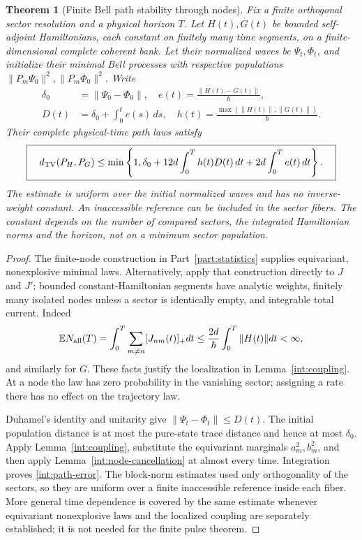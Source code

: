 \documentclass[11pt,oneside,openany]{book}
\newtheorem{theorem}{Theorem}[chapter]
\theoremstyle{definition}
\theoremstyle{remark}\newtheorem{remark}[theorem]{Remark}
\begin{document}
\begin{theorem}[Finite Bell path stability through nodes]\label{int:path-stability}
Fix a finite orthogonal sector resolution and a physical horizon $T$. Let $H(t),G(t)$ be bounded self-adjoint Hamiltonians, each constant on finitely many time segments, on a finite-dimensional complete coherent bank. Let their normalized waves be $\Psi_t,\Phi_t$, and initialize their minimal Bell processes with respective populations $\|P_m\Psi_0\|^2,\|P_m\Phi_0\|^2$. Write
\[
 \begin{aligned}\delta_0&=\|\Psi_0-\Phi_0\|,\quad
 e(t)=\frac{\|H(t)-G(t)\|}{\hbar},\\
 D(t)&=\delta_0+\int_0^t e(s)\,ds,\quad
 h(t)=\frac{\max(\|H(t)\|,\|G(t)\|)}{\hbar}.\end{aligned}
\]
Their complete physical-time path laws satisfy
\begin{equation}\label{int:path-error}
 \boxed{\quad d_{\rm TV}(P_H,P_G)
 \le\min\left\{1,\delta_0+12d\int_0^T h(t)D(t)\,dt
                      +2d\int_0^T e(t)\,dt\right\}.\quad}
\end{equation}
The estimate is uniform over the initial normalized waves and has no inverse-weight constant. An inaccessible reference can be included in the sector fibers. The constant depends on the number of compared sectors, the integrated Hamiltonian norms and the horizon, not on a minimum sector population.
\end{theorem}
\begin{proof}
The finite-node construction in Part~\ref{part:statistics} supplies equivariant, nonexplosive minimal laws. Alternatively, apply that construction directly to $J$ and $J'$; bounded constant-Hamiltonian segments have analytic weights, finitely many isolated nodes unless a sector is identically empty, and integrable total current. Indeed
\[
\mathbb E N_{\rm all}(T)=\int_0^T\sum_{m\ne n}[J_{nm}(t)]_+dt
 \le\frac{2d}{\hbar}\int_0^T\|H(t)\|dt<\infty,
\]
and similarly for $G$. These facts justify the localization in Lemma~\ref{int:coupling}. At a node the law has zero probability in the vanishing sector; assigning a rate there has no effect on the trajectory law.

Duhamel's identity and unitarity give $\|\Psi_t-\Phi_t\|\le D(t)$. The initial population distance is at most the pure-state trace distance and hence at most $\delta_0$. Apply Lemma~\ref{int:coupling}, substitute the equivariant marginals $a_m^2,b_m^2$, and then apply Lemma~\ref{int:node-cancellation} at almost every time. Integration proves \eqref{int:path-error}. The block-norm estimates used only orthogonality of the sectors, so they are uniform over a finite inaccessible reference inside each fiber. More general time dependence is covered by the same estimate whenever equivariant nonexplosive laws and the localized coupling are separately established; it is not needed for the finite pulse theorem.
\end{proof}
\end{document}
